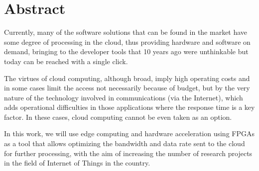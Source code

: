 \chapter*{Abstract}

Currently, many of the software solutions that can be found in the market have some degree of processing in the cloud, thus providing hardware and software on demand, bringing to the developer tools that 10 years ago were unthinkable but today can be reached with a single click.

The virtues of cloud computing, although broad, imply high operating costs and in some cases limit the access not necessarily because of budget, but by the very nature of the technology involved in communications (via the Internet), which adds operational difficulties in those applications where the response time is a key factor. In these cases, cloud computing cannot be even taken as an option.

In this work, we will use edge computing and hardware acceleration using FPGAs as a tool that allows optimizing the bandwidth and data rate sent to the cloud for further processing, with the aim of increasing the number of research projects in the field of Internet of Things in the country.
